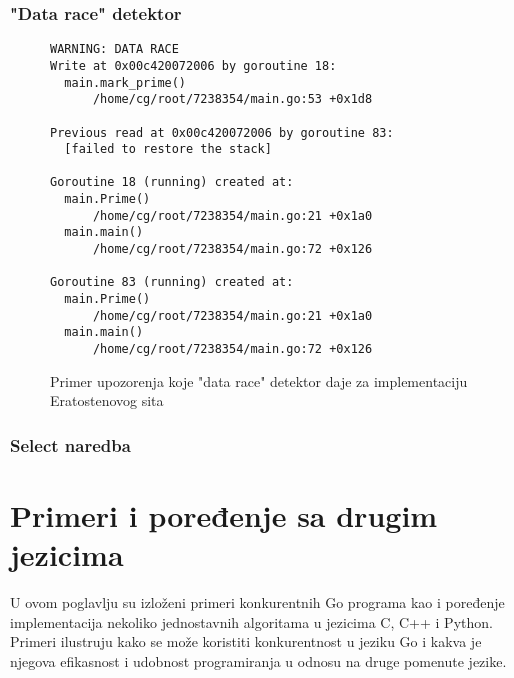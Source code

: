 \documentclass[12pt,oneside]{memoir}
\begin{document}
\subsection{"Data race" detektor}

\begin{figure}
\begin{center}

\begin{verbatim}
WARNING: DATA RACE
Write at 0x00c420072006 by goroutine 18:
  main.mark_prime()
      /home/cg/root/7238354/main.go:53 +0x1d8

Previous read at 0x00c420072006 by goroutine 83:
  [failed to restore the stack]

Goroutine 18 (running) created at:
  main.Prime()
      /home/cg/root/7238354/main.go:21 +0x1a0
  main.main()
      /home/cg/root/7238354/main.go:72 +0x126

Goroutine 83 (running) created at:
  main.Prime()
      /home/cg/root/7238354/main.go:21 +0x1a0
  main.main()
      /home/cg/root/7238354/main.go:72 +0x126
\end{verbatim}

\caption{Primer upozorenja koje "data race" detektor daje za implementaciju Eratostenovog sita}
\label{fig:datarace}
\end{center}
\end{figure}

\subsection{Select naredba}



\chapter {Primeri i poređenje sa drugim jezicima}
U ovom poglavlju su izloženi primeri konkurentnih Go programa kao i poređenje implementacija nekoliko jednostavnih algoritama u jezicima C, C++ i Python. Primeri ilustruju kako se može koristiti konkurentnost u jeziku Go i kakva je njegova efikasnost i udobnost programiranja u odnosu na druge pomenute jezike. 
\end{document}
